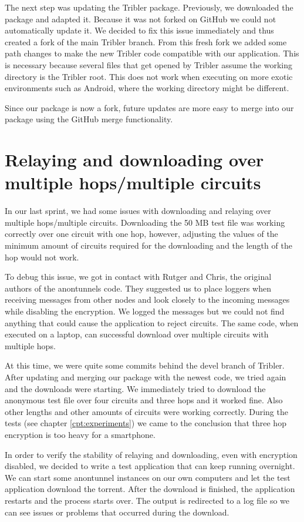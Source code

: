 		The next step was updating the Tribler package. Previously, we downloaded the package and adapted it. Because it was not forked on GitHub we could not automatically update it. We decided to fix this issue immediately and thus created a fork of the main Tribler branch. From this fresh fork we added some path changes to make the new Tribler code compatible with our application. This is necessary because several files that get opened by Tribler assume the working directory is the Tribler root. This does not work when executing on more exotic environments such as Android, where the working directory might be different.
		
		Since our package is now a fork, future updates are more easy to merge into our package using the GitHub merge functionality.
			
	\section{Relaying and downloading over multiple hops/multiple circuits}
		In our last sprint, we had some issues with downloading and relaying over multiple hops/multiple circuits. Downloading the 50 MB test file was working correctly over one circuit with one hop, however, adjusting the values of the minimum amount of circuits required for the downloading and the length of the hop would not work.
		
		To debug this issue, we got in contact with Rutger and Chris, the original authors of the anontunnels code. They suggested us to place loggers when receiving messages from other nodes and look closely to the incoming messages while disabling the encryption. We logged the messages but we could not find anything that could cause the application to reject circuits. The same code, when executed on a laptop, can successful download over multiple circuits with multiple hops.
		
		At this time, we were quite some commits behind the devel branch of Tribler. After updating and merging our package with the newest code, we tried again and the downloads were starting. We immediately tried to download the anonymous test file over four circuits and three hops and it worked fine. Also other lengths and other amounts of circuits were working correctly. During the tests (see chapter \ref{cpt:experiments}) we came to the conclusion that three hop encryption is too heavy for a smartphone.
		
		In order to verify the stability of relaying and downloading, even with encryption disabled, we decided to write a test application that can keep running overnight. We can start some anontunnel instances on our own computers and let the test application download the torrent. After the download is finished, the application restarts and the process starts over. The output is redirected to a log file so we can see issues or problems that occurred during the download.
			
